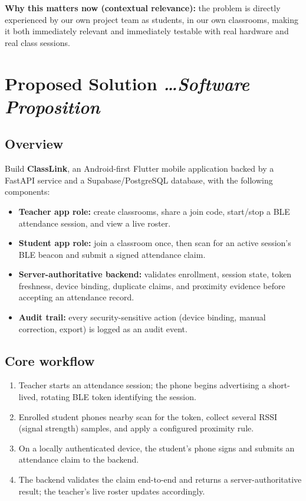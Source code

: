 \documentclass[11pt,a4paper]{article}
\newcommand{\BvrHint}[1]{%
  {\normalfont\normalsize\itshape\hfill #1}}
\begin{document}
\textbf{Why this matters now (contextual relevance):} the problem is
directly experienced by our own project team as students, in our own
classrooms, making it both immediately relevant and immediately
testable with real hardware and real class sessions.

\section{Proposed Solution %
\BvrHint{\ldots Software Proposition}}
\subsection{Overview}
Build \textbf{ClassLink}, an Android-first Flutter mobile application
backed by a FastAPI service and a Supabase/PostgreSQL database, with the
following components:
\begin{itemize}[leftmargin=0.7cm]
    \item \textbf{Teacher app role:} create classrooms, share a join code,
    start/stop a BLE attendance session, and view a live roster.
    \item \textbf{Student app role:} join a classroom once, then scan for
    an active session's BLE beacon and submit a signed attendance claim.
    \item \textbf{Server-authoritative backend:} validates enrollment,
    session state, token freshness, device binding, duplicate claims, and
    proximity evidence before accepting an attendance record.
    \item \textbf{Audit trail:} every security-sensitive action (device
    binding, manual correction, export) is logged as an audit event.
\end{itemize}

\subsection{Core workflow}
\begin{enumerate}[leftmargin=0.7cm]
    \item Teacher starts an attendance session; the phone begins
    advertising a short-lived, rotating BLE token identifying the
    session.
    \item Enrolled student phones nearby scan for the token, collect
    several RSSI (signal strength) samples, and apply a configured
    proximity rule.
    \item On a locally authenticated device, the student's phone signs and
    submits an attendance claim to the backend.
    \item The backend validates the claim end-to-end and returns a
    server-authoritative result; the teacher's live roster updates
    accordingly.
\end{enumerate}
\end{document}
